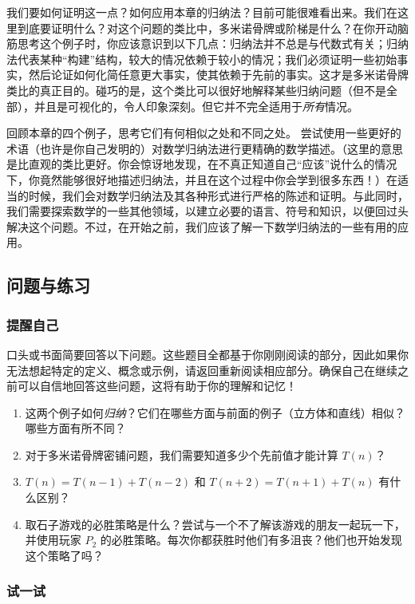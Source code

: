 我们要如何证明这一点？如何应用本章的归纳法？目前可能很难看出来。我们在这里到底要证明什么？对这个问题的类比中，多米诺骨牌或阶梯是什么？在你开动脑筋思考这个例子时，你应该意识到以下几点：归纳法并不总是与代数式有关；归纳法代表某种``构建''结构，较大的情况依赖于较小的情况；我们必须证明一些初始事实，然后论证如何化简任意更大事实，使其依赖于先前的事实。这才是多米诺骨牌类比的真正目的。碰巧的是，这个类比可以很好地解释某些归纳问题（但不是全部），并且是可视化的，令人印象深刻。但它并不完全适用于\emph{所有}情况。

回顾本章的四个例子，思考它们有何相似之处和不同之处。 尝试使用一些更好的术语（也许是你自己发明的）对数学归纳法进行更精确的数学描述。（这里的意思是比直观的类比更好。你会惊讶地发现，在不真正知道自己``应该''说什么的情况下，你竟然能够很好地描述归纳法，并且在这个过程中你会学到很多东西！）在适当的时候，我们会对数学归纳法及其各种形式进行严格的陈述和证明。与此同时，我们需要探索数学的一些其他领域，以建立必要的语言、符号和知识，以便回过头解决这个问题。不过，在开始之前，我们应该了解一下数学归纳法的一些有用的应用。

\subsection{问题与练习}

\subsubsection*{提醒自己}

口头或书面简要回答以下问题。这些题目全都基于你刚刚阅读的部分，因此如果你无法想起特定的定义、概念或示例，请返回重新阅读相应部分。确保自己在继续之前可以自信地回答这些问题，这将有助于你的理解和记忆！

\begin{enumerate}[label=(\arabic*)]
    \item 这两个例子如何\emph{归纳}？它们在哪些方面与前面的例子（立方体和直线）相似？哪些方面有所不同？
    \item 对于多米诺骨牌密铺问题，我们需要知道多少个先前值才能计算 $T(n)$？
    \item $T(n) = T(n - 1) + T(n - 2)$ 和 $T(n + 2) = T(n + 1) + T(n)$ 有什么区别？
    \item 取石子游戏的必胜策略是什么？尝试与一个不了解该游戏的朋友一起玩一下，并使用玩家 $P_2$ 的必胜策略。每次你都获胜时他们有多沮丧？他们也开始发现这个策略了吗？
\end{enumerate}

\subsubsection*{试一试}

